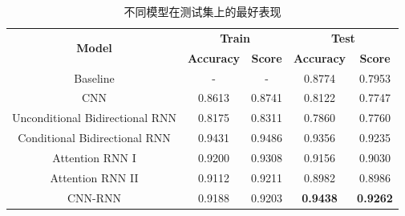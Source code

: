 \documentclass[a4paper]{article}
\begin{document}
	\begin{table}[H]
		\centering
		\caption{不同模型在测试集上的最好表现}
		\label{performance}
		\begin{tabular}{@{}ccccc@{}}
			\toprule
			\multirow{2}{*}{\textbf{Model}} & \multicolumn{2}{c}{\textbf{Train}} & \multicolumn{2}{c}{\textbf{Test}} \\ \cmidrule(l){2-5} 
			& \textbf{Accuracy}       & \textbf{Score}      & \textbf{Accuracy}      & \textbf{Score} \\ \cmidrule(l){1-5}
			Baseline & - & - & 0.8774 & 0.7953 \\
			CNN & 0.8613 & 0.8741 & 0.8122 & 0.7747 \\
			Unconditional Bidirectional RNN & 0.8175&0.8311 &0.7860 &0.7760 \\
			Conditional Bidirectional RNN &0.9431 &0.9486 &0.9356 &0.9235 \\
			Attention RNN I &0.9200 &0.9308 &0.9156 &0.9030 \\
			Attention RNN II &0.9112 &0.9211 &0.8982 &0.8986 \\
			CNN-RNN &0.9188 &0.9203 &\textbf{0.9438} &\textbf{0.9262} \\
			\bottomrule
		\end{tabular}
	\end{table}
\end{document}
